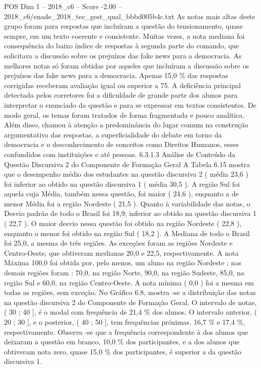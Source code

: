 \begin{textsample}{POS Dim 1 – 2018\_c6 – Score -2.00 – 2018\_c6/enade\_2018\_tec\_gest\_qual\_bbbd005b4c.txt}
As notas mais altas deste grupo foram para respostas que incluíram a questão do tensionamento, quase sempre, em um texto coerente e consistente.
Muitas vezes, a nota mediana foi consequência do baixo índice de respostas à segunda parte do comando, que solicitava a discussão sobre os prejuízos das fake news para a democracia.
As melhores notas só foram obtidas por aqueles que incluíram a discussão sobre os prejuízos das fake news para a democracia.
Apenas 15,0 \% das respostas corrigidas receberam avaliação igual ou superior a 75.
A deficiência principal detectada pelos corretores foi a dificuldade de grande parte dos alunos para interpretar o enunciado da questão e para se expressar em textos consistentes.
De modo geral, os temas foram tratados de forma fragmentada e pouco analítica.
Além disso, chamou à atenção a predominância do lugar comum na construção argumentativa das respostas, a superficialidade do debate em torno da democracia e o desconhecimento de conceitos como Direitos Humanos, esses confundidos com instituições e até pessoas. 6.3.1.3 Análise de Conteúdo da Questão Discursiva 2 do Componente de Formação Geral A Tabela 6.15 mostra que o desempenho médio dos estudantes na questão discursiva 2 ( média 23,6 ) foi inferior ao obtido na questão discursiva 1 ( média 30,5 ).
A região Sul foi aquela cuja Média, também nessa questão, foi maior ( 24,6 ), enquanto a de menor Média foi a região Nordeste ( 21,5 ).
Quanto à variabilidade das notas, o Desvio padrão de todo o Brasil foi 18,9, inferior ao obtido na questão discursiva 1 ( 22,7 ).
O maior desvio nessa questão foi obtido na região Nordeste ( 22,8 ), enquanto o menor foi obtido na região Sul ( 18,2 ).
A Mediana de todo o Brasil foi 25,0, a mesma de três regiões.
As exceções foram as regiões Nordeste e Centro-Oeste, que obtiveram medianas 20,0 e 22,5, respectivamente.
A nota Máxima 100,0 foi obtida por, pelo menos, um aluno na região Nordeste ; nas demais regiões foram : 70,0, na região Norte, 90,0, na região Sudeste, 85,0, na região Sul e 60,0, na região Centro-Oeste.
A nota mínima ( 0,0 ) foi a mesma em todas as regiões, sem exceção.
No Gráfico 6.8, mostra -se a distribuição das notas na questão discursiva 2 do Componente de Formação Geral.
O intervalo de notas, ( 30 ; 40 ], é o modal com frequência de 21,4 \% dos alunos.
O intervalo anterior, ( 20 ; 30 ], e o posterior, ( 40 ; 50 ], tem frequências próximas, 16,7 \% e 17,4 \%, respectivamente.
Observa -se que a frequência correspondente à dos alunos que deixaram a questão em branco, 10,0 \% dos participantes, e a dos alunos que obtiveram nota zero, quase 15,0 \% dos participantes, é superior a da questão discursiva 1.

\end{textsample}
